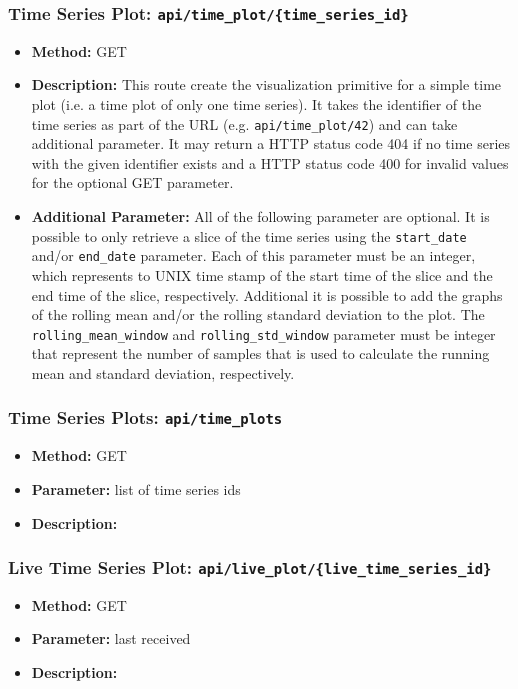 \documentclass[11pt, a4paper]{article}
\begin{document}
\subsubsection*{Time Series Plot: \texttt{api/time\_plot/\{time\_series\_id\}}}
\begin{itemize}
 \item[] \textbf{Method:} GET 
 \item[] \textbf{Description:} This route create the visualization primitive for a simple time plot (i.e. a time plot of only one time series).
 It takes the identifier of the time series as part of the URL (e.g. \texttt{api/time\_plot/42}) and can take additional parameter.
 It may return a HTTP status code 404 if no time series with the given identifier exists and a HTTP status code 400 for invalid values for the optional GET parameter.
 \item[] \textbf{Additional Parameter:} All of the following parameter are optional.
 It is possible to only retrieve a slice of the time series using the \texttt{start\_date} and/or \texttt{end\_date} parameter.
 Each of this parameter must be an integer, which represents to UNIX time stamp of the start time of the slice and the end time of the slice, respectively. 
 Additional it is possible to add the graphs of the rolling mean and/or the rolling standard deviation to the plot.
 The \texttt{rolling\_mean\_window} and \texttt{rolling\_std\_window} parameter must be integer that represent the number of samples that is used to calculate the running mean and standard deviation, respectively.
\end{itemize}

\subsubsection*{Time Series Plots: \texttt{api/time\_plots}}
\begin{itemize}
 \item[] \textbf{Method:} GET 
 \item[] \textbf{Parameter:} list of time series ids
 \item[] \textbf{Description:} 
\end{itemize}

\subsubsection*{Live Time Series Plot: \texttt{api/live\_plot/\{live\_time\_series\_id\}}}
\begin{itemize}
 \item[] \textbf{Method:} GET 
 \item[] \textbf{Parameter:} last received
 \item[] \textbf{Description:} 
\end{itemize}
\end{document}
